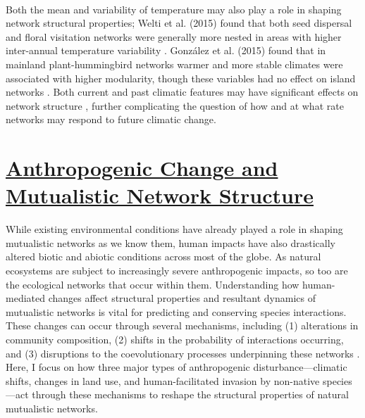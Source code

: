 \paragraph*{}
Both the mean and variability of temperature may also play a role in shaping network structural properties; Welti et al. (2015) found that both seed dispersal and floral visitation networks were generally more nested in areas with higher inter-annual temperature variability \parencite{welti2015structure}. Gonz{\'a}lez et al. (2015) found that in mainland plant-hummingbird networks warmer and more stable climates were associated with higher modularity, though these variables had no effect on island networks \parencite{Gonzales2015macroecology}. Both current and past climatic features may have significant effects on network structure \parencite{dalsgaard2013}, further complicating the question of how and at what rate networks may respond to future climatic change. 

\section*{\textbf{\underline{Anthropogenic Change and Mutualistic Network Structure}}}
While existing environmental conditions have already played a role in shaping mutualistic networks as we know them, human impacts have also drastically altered biotic and abiotic conditions across most of the globe. As natural ecosystems are subject to increasingly severe anthropogenic impacts, so too are the ecological networks that occur within them. Understanding how human-mediated changes affect structural properties and resultant dynamics of mutualistic networks is vital for predicting and conserving species interactions. These changes can occur through several mechanisms, including (1) alterations in community composition, (2) shifts in the probability of interactions occurring, and (3) disruptions to the coevolutionary processes underpinning these networks \parencite{tylianakis2017}. Here, I focus on how three major types of anthropogenic disturbance—climatic shifts, changes in land use, and human-facilitated invasion by non-native species—act through these mechanisms to reshape the structural properties of natural mutualistic networks.
